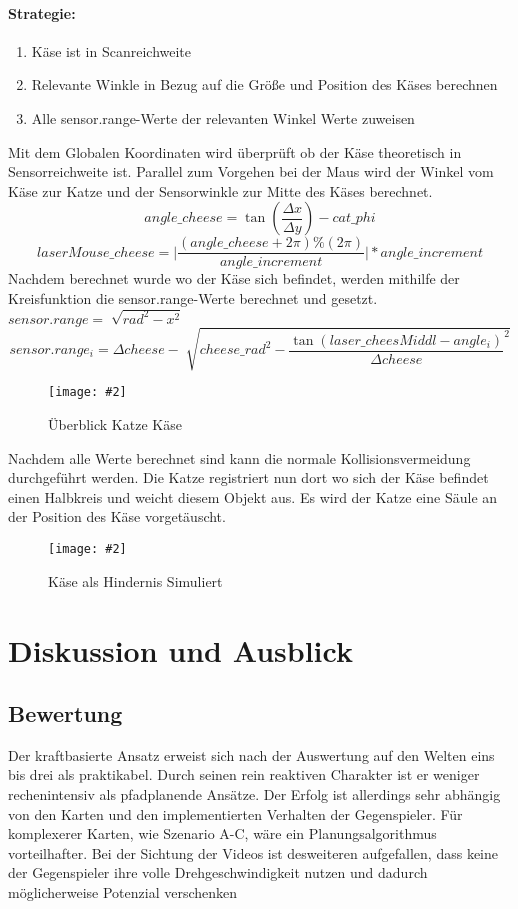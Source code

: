 \documentclass[
a4paper,     %
12pt         %
]{scrartcl}  %
\newcommand{\mygraphics}[3]{
\begin{figure}[!h]
  \begin{center}
    \texttt{[image: \#2]} \\
    \caption{#3}\label{fig:#2}
  \end{center}
\end{figure}

}
\begin{document}
\paragraph{Strategie:}
\begin{enumerate}
\item Käse ist in Scanreichweite
\item Relevante Winkle in Bezug auf die Größe und Position des Käses berechnen
\item Alle sensor.range-Werte der relevanten Winkel Werte zuweisen
\end{enumerate}
Mit dem Globalen Koordinaten wird überprüft ob der Käse theoretisch in Sensorreichweite ist. Parallel zum Vorgehen bei der Maus wird der Winkel vom Käse zur Katze und der Sensorwinkle zur Mitte des Käses berechnet.
\[ angle\_cheese=\tan( \frac{\Delta x}{\Delta y} ) -cat\_phi \]
\[ laserMouse\_cheese  =  \vert \frac{ (angle\_cheese + 2  \pi) \% (2 \pi)}{angle\_increment}  \vert * angle\_increment \]
Nachdem berechnet wurde wo der Käse sich befindet, werden mithilfe der Kreisfunktion die sensor.range-Werte berechnet und gesetzt. $ sensor.range=\sqrt[]{ rad^2 -x^2 }$
\[ sensor.range_i = \Delta cheese - \sqrt[]{ cheese\_rad^2 -\frac{\tan( laser\_cheesMiddl - angle_i) }{\Delta cheese}^2 }\]
\hspace*{0.63\textwidth}
\mygraphics{0.5\textwidth}{catcheese.png}{Überblick Katze Käse}
Nachdem alle Werte berechnet sind kann die normale Kollisionsvermeidung durchgeführt werden. Die Katze registriert nun dort wo sich der Käse befindet einen Halbkreis und weicht diesem Objekt aus. 
Es wird der Katze eine Säule an der Position des Käse vorgetäuscht.
\mygraphics{0.5\textwidth}{collisionCHEESE.png}{Käse als Hindernis Simuliert}\clearpage
\section{Diskussion und Ausblick}
\subsection{Bewertung}
Der kraftbasierte Ansatz erweist sich nach der Auswertung auf den Welten eins bis drei als praktikabel. Durch seinen rein reaktiven Charakter ist er weniger rechenintensiv als pfadplanende Ansätze. 
Der Erfolg ist allerdings sehr abhängig von den Karten und den implementierten Verhalten der Gegenspieler. Für komplexerer Karten, wie Szenario A-C, wäre ein Planungsalgorithmus vorteilhafter. Bei der Sichtung der Videos ist desweiteren aufgefallen, dass keine der Gegenspieler ihre volle Drehgeschwindigkeit nutzen und dadurch möglicherweise Potenzial verschenken
\end{document}
